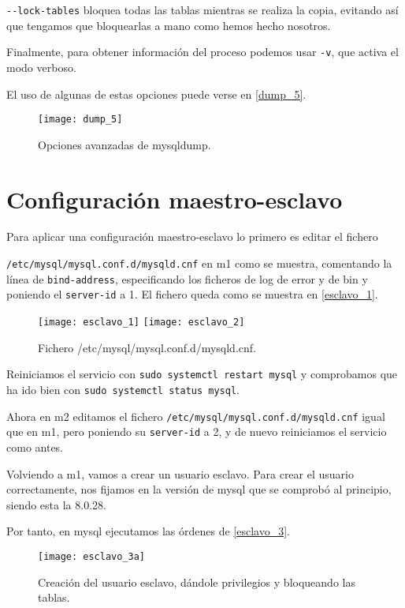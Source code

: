 \verb|--lock-tables| bloquea todas las tablas mientras se realiza la copia, evitando así que tengamos que bloquearlas a mano como hemos hecho nosotros.

Finalmente, para obtener información del proceso podemos usar \verb|-v|, que activa el modo verboso.

El uso de algunas de estas opciones puede verse en \eqref{dump_5}.

\begin{figure}[h!]
\begin{center}
\caption{Opciones avanzadas de mysqldump.}
\label{dump_5}
\texttt{[image: dump\_5]}
\end{center}
\end{figure}

\chapter{Configuración maestro-esclavo}

Para aplicar una configuración maestro-esclavo lo primero es editar el fichero

\verb|/etc/mysql/mysql.conf.d/mysqld.cnf| en m1 como se muestra, comentando la línea de \verb|bind-address|, especificando los ficheros de log de error y de bin y poniendo el \verb|server-id| a 1. El fichero queda como se muestra en \eqref{esclavo_1}.

\begin{figure}[h!]
\begin{center}
\caption{Fichero /etc/mysql/mysql.conf.d/mysqld.cnf.}
\label{esclavo_1}
\texttt{[image: esclavo\_1]}
\texttt{[image: esclavo\_2]}
\end{center}
\end{figure}

Reiniciamos el servicio con \verb|sudo systemctl restart mysql| y comprobamos que ha ido bien con \verb|sudo systemctl status mysql|.

Ahora en m2 editamos el fichero \verb|/etc/mysql/mysql.conf.d/mysqld.cnf| igual que en m1, pero poniendo su \verb|server-id| a 2, y de nuevo reiniciamos el servicio como antes.

Volviendo a m1, vamos a crear un usuario esclavo. Para crear el usuario correctamente, nos fijamos en la versión de mysql que se comprobó al principio, siendo esta la 8.0.28.

Por tanto, en mysql ejecutamos las órdenes de \eqref{esclavo_3}.

\begin{figure}[h!]
\begin{center}
\caption{Creación del usuario esclavo, dándole privilegios y bloqueando las tablas.}
\label{esclavo_3}
\texttt{[image: esclavo\_3a]}
\end{center}
\end{figure}

